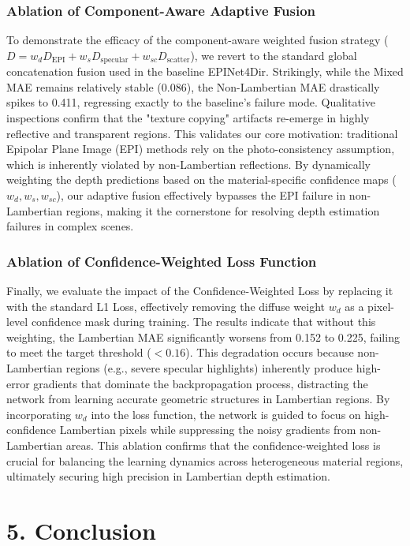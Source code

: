 \documentclass[journal]{IEEEtran}
\begin{document}
\subsubsection{Ablation of Component-Aware Adaptive Fusion}
To demonstrate the efficacy of the component-aware weighted fusion strategy ($D = w_d D_{\text{EPI}} + w_s D_{\text{specular}} + w_{sc} D_{\text{scatter}}$), we revert to the standard global concatenation fusion used in the baseline EPINet4Dir. Strikingly, while the Mixed MAE remains relatively stable (0.086), the Non-Lambertian MAE drastically spikes to 0.411, regressing exactly to the baseline's failure mode. Qualitative inspections confirm that the "texture copying" artifacts re-emerge in highly reflective and transparent regions. This validates our core motivation: traditional Epipolar Plane Image (EPI) methods rely on the photo-consistency assumption, which is inherently violated by non-Lambertian reflections. By dynamically weighting the depth predictions based on the material-specific confidence maps ($w_d, w_s, w_{sc}$), our adaptive fusion effectively bypasses the EPI failure in non-Lambertian regions, making it the cornerstone for resolving depth estimation failures in complex scenes.

\subsubsection{Ablation of Confidence-Weighted Loss Function}
Finally, we evaluate the impact of the Confidence-Weighted Loss by replacing it with the standard L1 Loss, effectively removing the diffuse weight $w_d$ as a pixel-level confidence mask during training. The results indicate that without this weighting, the Lambertian MAE significantly worsens from 0.152 to 0.225, failing to meet the target threshold ($<0.16$). This degradation occurs because non-Lambertian regions (e.g., severe specular highlights) inherently produce high-error gradients that dominate the backpropagation process, distracting the network from learning accurate geometric structures in Lambertian regions. By incorporating $w_d$ into the loss function, the network is guided to focus on high-confidence Lambertian pixels while suppressing the noisy gradients from non-Lambertian areas. This ablation confirms that the confidence-weighted loss is crucial for balancing the learning dynamics across heterogeneous material regions, ultimately securing high precision in Lambertian depth estimation.

\section{5. Conclusion}
\end{document}
